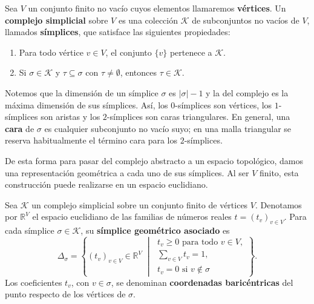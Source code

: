 \begin{definition}
\label{def:complejo-simplicial}
Sea $V$ un conjunto finito no vacío cuyos elementos llamaremos \textbf{vértices}. Un \textbf{complejo simplicial} sobre $V$ es una colección $\mathcal{K}$ de subconjuntos no vacíos de $V$, llamados \textbf{símplices}, que satisface las siguientes propiedades:
    \begin{enumerate}
        \item Para todo vértice $v \in V$, el conjunto $\{v\}$ pertenece a $\mathcal{K}$.
        \item Si $\sigma \in \mathcal{K}$ y $\tau \subseteq \sigma$ con $\tau \neq \emptyset$, entonces $\tau \in \mathcal{K}$.
    \end{enumerate}
\end{definition}

Notemos que la dimensión de un símplice $\sigma$ es $|\sigma|-1$ y la del complejo es la máxima dimensión de sus símplices. Así, los $0$-símplices son vértices, los $1$-símplices son aristas y los $2$-símplices son caras triangulares. En general, una \textbf{cara} de $\sigma$ es cualquier subconjunto no vacío suyo; en una malla triangular se reserva habitualmente el término cara para los $2$-símplices.

De esta forma para pasar del complejo abstracto a un espacio topológico, damos una representación geométrica a cada uno de sus símplices. Al ser $V$ finito, esta construcción puede realizarse en un espacio euclidiano.

\begin{definition}
\label{def:simplice-geometrico}
Sea $\mathcal{K}$ un complejo simplicial sobre un conjunto finito de vértices $V$. Denotamos por $\mathbb{R}^{V}$ el espacio euclidiano de las familias de números reales $t=(t_v)_{v\in V}$. Para cada símplice $\sigma\in\mathcal{K}$, su \textbf{símplice geométrico asociado} es
\[
\Delta_\sigma=
\left\{
(t_v)_{v\in V}\in\mathbb{R}^{V}
\;\middle|\;
\begin{array}{l}
t_v\geq0 \text{ para todo }v\in V,\\[2pt]
\displaystyle\sum_{v\in V}t_v=1,\\[4pt]
t_v=0 \text{ si }v\notin\sigma
\end{array}
\right\}.
\]
Los coeficientes $t_v$, con $v\in\sigma$, se denominan \textbf{coordenadas baricéntricas} del punto respecto de los vértices de $\sigma$.
\end{definition}

